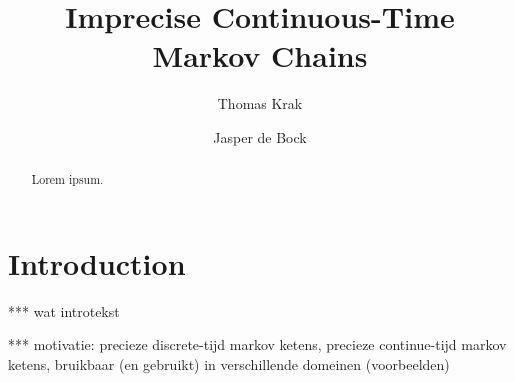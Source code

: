 \documentclass[10pt]{paper}
\title{Imprecise Continuous-Time Markov Chains}
\author{Thomas Krak \and Jasper de Bock}
\theoremstyle{definition}
\begin{document}


\date{}
\maketitle

\begin{abstract}
Lorem ipsum.
\end{abstract}

\section{Introduction}\label{sec:introduction}

*** wat introtekst

*** motivatie: precieze discrete-tijd markov ketens, precieze continue-tijd markov ketens, bruikbaar (en gebruikt) in verschillende domeinen (voorbeelden)
\end{document}

